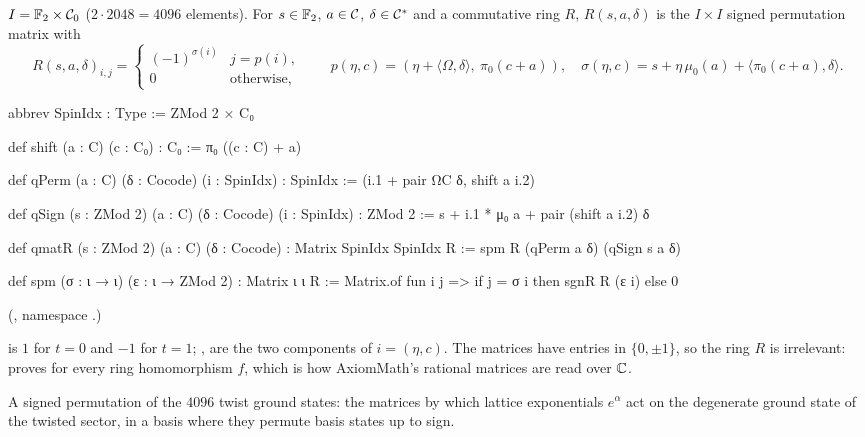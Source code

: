 \begin{definition}\label{ch21:def:qmatR}
$I=\mathbb{F}_2\times\mathcal{C}_0$ ($2\cdot2048=4096$ elements).  For $s\in\mathbb{F}_2$, $a\in\mathcal{C}$, $\delta\in\mathcal{C}^*$
and a commutative ring $R$, $R(s,a,\delta)$ is the $I\times I$ signed permutation matrix with
\begin{equation*}
  R(s,a,\delta)_{i,j}=\begin{cases}(-1)^{\sigma(i)}&j=p(i),\\0&\text{otherwise,}\end{cases}\qquad
  p(\eta,c)=(\eta+\langle\Omega,\delta\rangle,\ \pi_0(c+a)),\quad
  \sigma(\eta,c)=s+\eta\,\mu_0(a)+\langle\pi_0(c+a),\delta\rangle .
\end{equation*}
\end{definition}
\begin{leancode}
abbrev SpinIdx : Type := ZMod 2 × C₀

def shift (a : C) (c : C₀) : C₀ := π₀ ((c : C) + a)
\end{leancode}
\begin{leancode}
def qPerm (a : C) (δ : Cocode) (i : SpinIdx) : SpinIdx :=
  (i.1 + pair ΩC δ, shift a i.2)

def qSign (s : ZMod 2) (a : C) (δ : Cocode) (i : SpinIdx) : ZMod 2 :=
  s + i.1 * μ₀ a + pair (shift a i.2) δ
\end{leancode}
\begin{leancode}
def qmatR (s : ZMod 2) (a : C) (δ : Cocode) : Matrix SpinIdx SpinIdx R :=
  spm R (qPerm a δ) (qSign s a δ)
\end{leancode}
\begin{leancode}
def spm (σ : ι → ι) (ε : ι → ZMod 2) : Matrix ι ι R :=
  Matrix.of fun i j => if j = σ i then sgnR R (ε i) else 0
\end{leancode}
(, namespace .)
\begin{dictionary}
 is $1$ for $t=0$ and $-1$ for $t=1$; ,  are the two components of
$i=(\eta,c)$.  The matrices have entries in $\{0,\pm1\}$, so the ring $R$ is irrelevant:
 proves  for every ring
homomorphism $f$, which is how AxiomMath's rational matrices are read over ${\mathbb{C}}$.
\end{dictionary}
\begin{physics}
A signed permutation of the $4096$ twist ground states: the matrices by which lattice exponentials
$e^\alpha$ act on the degenerate ground state of the twisted sector, in a basis where they permute
basis states up to sign.
\end{physics}
